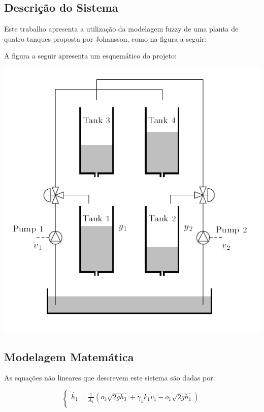 \documentclass[a0,portrait]{a0poster}
\begin{document}
\begin{multicols}{2}
\section*{Descrição do Sistema}

\color{Black}

Este trabalho apresenta a utilização da modelagem fuzzy de uma planta de quatro tanques proposta por Johansson, como na figura a seguir:

\indent A figura a seguir apresenta um esquemático do projeto:

\begin{center}\vspace{1.5cm}
\includegraphics[width=0.5\linewidth]{imgs/4tank.png}
\end{center}
\vspace{1.5cm}

\vspace{1cm}
\color{DarkSlateGray} %

\subsection*{Modelagem Matemática}

\color{Black}

As equações não lineares que descrevem este sistema são dadas por:

\vspace{0.2cm}
\begin{equation}
	\begin{cases}
		\dot{h_{1}} = \frac{1}{A_{1}}(o_{3}\sqrt{2gh_{3}} + \gamma_{1}k_{1}v_{1} - o_{1}\sqrt{2gh_{1}})\\
		

\end{cases}
\end{equation}
\end{multicols}
\end{document}
